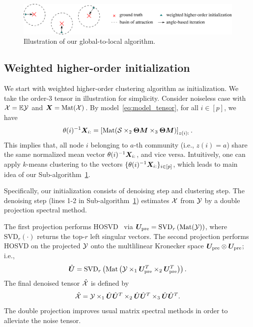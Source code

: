 \documentclass[lettersize,onecolumn,journal]{IEEEtran}
\theoremstyle{definition}
\theoremstyle{definition}
\newcommand{\of}[1]{\left(#1\right)}
\newcommand{\off}[1]{\left[#1\right]}
\begin{document}
\begin{figure}[t]
\centering
\includegraphics[width=\columnwidth]{alg_demo1.pdf}
\caption{Illustration of our global-to-local algorithm.}\label{fig:demo}
\end{figure}

\subsection{Weighted higher-order initialization}

We start with weighted higher-order clustering algorithm as initialization. {\color{blue} We take the order-3 tensor in illustration for simplicity.}  Consider noiseless case with $\mathcal{X} = \mathbb{E}\mathcal{Y}$ and $\bm X = \text{Mat}(\mathcal{X})$. 
By model~\eqref{eq:model_tensor}, for all $i \in [p]$, we have
\begin{equation}\label{eq:kmeans}
    \theta(i)^{-1} \mX_{i:} = \off{\text{Mat}( \tS \times_2 \mTheta \mM \times_3  \mTheta \mM )}_{z(i):}. 
\end{equation}
This implies that, all node $i$ belonging to $a$-th community (i.e., $z(i)=a$) share the same normalized mean vector $\theta(i)^{-1} \bm X_{i:}$, and vice versa. Intuitively, one can apply $k$-means clustering to the vectors $\{ \theta(i)^{-1} \bm X_{i:} \}_{i\in[p]}$, which leads to main idea of our Sub-algorithm~\hyperref[alg:main]{1}.  


Specifically, our initialization consists of denoising step and clustering step. The denoising step (lines 1-2 in Sub-algorithm~\hyperref[alg:main]{1}) estimates $\mathcal{X}$ from $\mathcal{Y}$ by a double projection spectral method.  
{\color{blue}
The first projection performs HOSVD~\citep{de2000multilinear} via $\mU_{\text{pre}} = \text{SVD}_{r} \of{ \text{Mat}(\tY) }$, where $\text{SVD}_r(\cdot)$ returns the top-$r$ left singular vectors. The second projection performs HOSVD on the projected $\mathcal{Y}$ onto the multlilinear Kronecker space $\bm{U}_{\text{pre}} \otimes  \bm{U}_{\text{pre}}$; i.e.,
\begin{equation}\label{eq:two-step_factor}
    \hat \mU = \text{SVD}_{r} \of{\text{Mat}\of{ \tY\times_1  \mU_{\text{pre}}^T \times_2  \mU_{\text{pre}}^T }}.
\end{equation}
The final denoised tensor $\hat {\mathcal{X}}$ is defined by
\begin{equation}\label{eq:two-step_est}
    \hat \tX = \tY \times_1 \hat \mU \hat 
\mU^T \times_2 \hat \mU \hat \mU^T \times_3 \hat \mU \hat \mU^T. 
\end{equation}
The double projection improves usual matrix spectral methods in order to alleviate the noise tensor.

}
\end{document}
